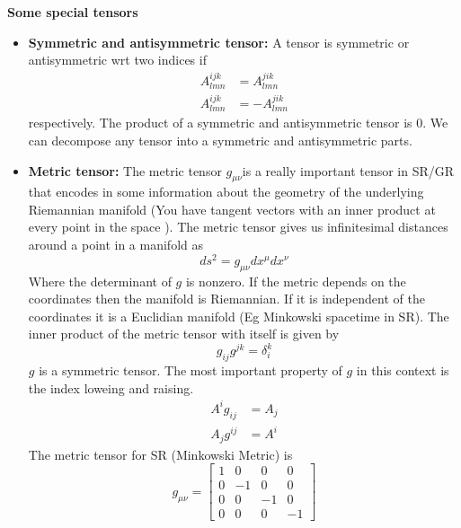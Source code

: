 \documentclass{article}
\begin{document}
\textbf{Some special tensors} 
\begin{itemize}
    \item \textbf{Symmetric and antisymmetric tensor:} A tensor is symmetric or antisymmetric wrt two indices if 
    \begin{align*}
        A_{lmn}^{ijk} &= A_{lmn}^{jik} \\
        A_{lmn}^{ijk} &= -A_{lmn}^{jik}
    \end{align*} 
    respectively. The product of a symmetric and antisymmetric tensor is 0. We can decompose any tensor into a symmetric and antisymmetric parts. 
    \item \textbf{Metric tensor:} The metric tensor \(g_{\mu\nu}\)is a really important tensor in SR/GR that encodes in some information about the geometry of the underlying Riemannian manifold (You have tangent vectors with an inner product at every point in the space ). The metric tensor gives us infinitesimal distances around a point in a manifold as 
    \begin{equation*}
        ds^2 = g_{\mu\nu}dx^\mu dx^\nu
    \end{equation*}
    Where the determinant of \(g\) is nonzero. 
    If the metric depends on the coordinates then the manifold is Riemannian. If it is independent of the coordinates it is a Euclidian manifold (Eg Minkowski spacetime in SR). The inner product of the metric tensor with itself is given by 
    \begin{equation*}
        g_{ij}g^{jk} = \delta_i^{k}
    \end{equation*}   
    \(g\) is a symmetric tensor. The most important property of \(g\) in this context is the index loweing and raising. 
    \begin{align*}
        A^i g_{ij} &= A_j \\
        A_j g^{ij} &= A^i
    \end{align*}
    The metric tensor for SR (Minkowski Metric) is 
    \begin{equation*}
        g_{\mu\nu} = \begin{bmatrix}
            1 & 0 & 0 & 0 \\
            0 & -1 & 0 & 0 \\
            0 & 0 & -1 & 0 \\
            0 & 0 & 0 & -1
        \end{bmatrix}
    \end{equation*}
\end{itemize}
\end{document}
